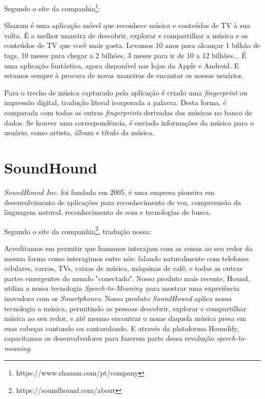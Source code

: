 Segundo o site da companhia\footnote{https://www.shazam.com/pt/company}:
\begin{citation}
Shazam é uma aplicação móvel que reconhece música e conteúdos de TV à sua volta. É a melhor maneira de descobrir, explorar e compartilhar a música e os conteúdos de TV que você mais gosta. Levamos 10 anos para alcançar 1 bilhão de tags, 10 meses para chegar a 2 bilhões, 3 meses para ir de 10 a 12 bilhões... É uma aplicação fantástica, agora disponível nas lojas da Apple e Android. E estamos sempre à procura de novas maneiras de encantar os nossos usuários.
\end{citation}

Para o trecho de música capturado pela aplicação é criado uma \textit{fingerprint} ou impressão digital, tradução literal icorporada a palavra. Desta forma, é comparada com todas as outras \textit{fingerprints} derivadas das músicas no banco de dados. Se houver uma correspondência, é enviado informações da música para o usuário, como artista, álbum e título da música.

\section{SoundHound}
\textit{SoundHound Inc.} foi fundada em 2005, é uma empresa pioneira em desenvolvimento de aplicações para reconhecimento de voz, compreensão da linguagem natural, reconhecimento de som e tecnologias de busca.

Segundo o site da companhia\footnote{https://soundhound.com/about}, tradução nossa:

\begin{citation}
Acreditamos em permitir que humanos interajam com as coisas ao seu redor da mesma forma como interagimos entre nós: falando naturalmente com telefones celulares, carros, TVs, caixas de música, máquinas de café, e todas as outras partes emergentes do mundo "conectado". Nosso produto mais recente, Hound, utiliza a nossa tecnologia \textit{Speech-to-Meaning}\texttrademark\ para mostrar uma experiência inovadora com os \textit{Smartphones}. Nosso produto \textit{SoundHound} aplica nossa tecnologia a música, permitindo as pessoas descobrir, explorar e compartilhar música ao seu redor, e até mesmo encontrar o nome daquela música presa em suas cabeças cantando ou cantarolando. E através da plataforma Houndify, capacitamos os desenvolvedores para fazerem parte dessa revolução \textit{speech-to-meaning}.
\end{citation}

